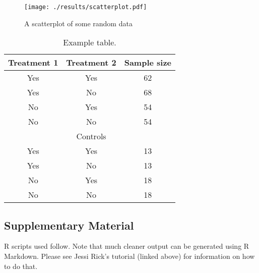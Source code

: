 



\pagebreak
\begin{figure}[H]
    \centering
    \texttt{[image: ./results/scatterplot.pdf]}
  \captionsetup{width=0.75\textwidth}
  \caption{A scatterplot of some random data}
    	\label{fig:scatterplot} %
\end{figure}

\pagebreak
\begin{table}[H]
    \centering
	\caption{Example table.}
	\label{table:simpleExample}
	\begin{tabular}{ccc} %
    \hline
	Treatment 1 & Treatment 2 & Sample size \\
    \hline
	 Yes & Yes & 62\\
	 Yes & No & 68\\
	 No & Yes & 54\\
	 No & No & 54\\
	 \hline
    & Controls & \\
    \hline
     Yes & Yes & 13\\
	 Yes & No & 13\\
	 No & Yes & 18\\
	 No & No & 18\\
	\hline
	\end{tabular}
\end{table}




\pagebreak
\subsection*{Supplementary Material}
\setcounter{table}{0} \renewcommand{\thetable}{S\arabic{table}}
\setcounter{figure}{0} \renewcommand{\thefigure}{S\arabic{figure}}

R scripts used follow. Note that much cleaner output can be generated using R Markdown. Please see Jessi Rick's tutorial (linked above) for information on how to do that. 
%
%

%
